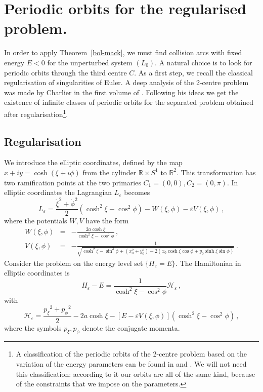 \documentclass[a4paper]{article}
\begin{document}
\section{Periodic orbits for the regularised problem.}
\label{regular_periodic}
In order to apply Theorem~\ref{bol-mack}, we must find collision arcs
with fixed energy $E<0$ for the unperturbed system $(L_0)$.  A natural
choice is to look for periodic orbits through the third centre $C$.
As a first step, we recall the classical regularisation of
singularities of Euler.  A deep analysis of the 2-centre problem was
made by Charlier in the first volume of \cite{Ch}.  Following his
ideas we get the existence of infinite classes of periodic orbits for
the separated problem obtained after regularisation\footnote{A
  classification of the periodic orbits of the 2-centre problem based
  on the variation of the energy parameters can be found in \cite{DY}
  and \cite{DYB}.  We will not need this classification: according to
  it our orbits are all of the same kind, because of the constraints
  that we impose on the parameters.}.

\subsection{Regularisation}
We introduce the elliptic coordinates, defined by the map
$x+iy=\cosh(\xi+i\phi)$ from the cylinder ${\mathbb{R}} \times S^1$ to ${\mathbb{R}}^2$.
This transformation has two ramification points at the two primaries
$C_1=(0,0),C_2=(0,\pi)$.  In elliptic coordinates the Lagrangian
$L_{\varepsilon}$ becomes
\[
L_{\varepsilon}=\frac{\dot{\xi}^2+\dot{\phi}^2}{2}(\cosh^2\xi-\cos^2\phi)
-W(\xi,\phi) -\varepsilon V(\xi,\phi)\,,
\] 
where the potentials $W,V$ have the form
\begin{eqnarray*}
W(\xi,\phi)&=&-\frac{2 a \cosh \xi}{\cosh^2\xi-\cos^2\phi} \,,
\\ 
V(\xi,\phi)&=&-\frac{1}{\sqrt{\cosh^2\xi-\sin^2\phi+(x_0^2+y_0^2)
    -2(x_0\cosh\xi\cos\phi+y_0\sinh\xi\sin\phi)}} \ .
\end{eqnarray*}
Consider the problem on the energy level set $\{H_{\varepsilon}=E\}$.
The Hamiltonian in elliptic coordinates is
\[
H_{\varepsilon}-E = 
\frac{1}{\cosh^2 \xi - \cos^2\phi}\mathcal{H}_{\varepsilon}\,,
\]
with
\[
\mathcal{H}_{\varepsilon} = \frac{{p_\xi}^2  + {p_\phi}^2}{2} -
2a \cosh \xi-\left[E- \varepsilon V(\xi,\phi)\right]
(\cosh^2 \xi - \cos^2\phi)\,,
\]
where the symbols $p_{\xi},p_{\phi}$ denote the conjugate momenta.
\end{document}
